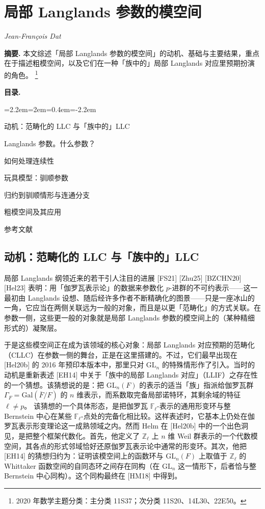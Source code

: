 \chapter{局部 Langlands 参数的模空间}
\begin{center}
{\small\itshape Jean-François Dat}
\end{center}
\medskip
\noindent\textbf{摘要.} 本文综述「局部 Langlands 参数的模空间」的动机、基础与主要结果，重点在于描述粗模空间，以及它们在一种「族中的」局部 Langlands 对应里预期扮演的角色。
\footnote{2020 年数学主题分类：主分类 11S37；次分类 11S20、14L30、22E50。}

\medskip
\noindent\textbf{目录.}
\begin{list}{}{\leftmargin=2.2em=2em=0.4em\itemindent=-2.2em}
\item 动机：范畴化的 LLC 与「族中的」LLC
\item Langlands 参数。什么参数？
\item 如何处理连续性
\item 玩具模型：驯顺参数
\item 归约到驯顺情形与连通分支
\item 粗模空间及其应用
\item 参考文献
\end{list}

\section{动机：范畴化的 LLC 与「族中的」LLC}

局部 Langlands 纲领近来的若干引人注目的进展 [FS21] [Zhu25] [BZCHN20] [Hel23] 表明：用「伽罗瓦表示论」的数据来参数化 $p$-进群的不可约表示——这一最初由 Langlands 设想、随后经许多作者不断精确化的图景——只是一座冰山的一角，它应当在两侧关联远为一般的对象，而且是以更「范畴化」的方式关联。在参数一侧，这些更一般的对象就是局部 Langlands 参数的模空间上的（某种精细形式的）凝聚层。

于是这些模空间正在成为该领域的核心对象：局部 Langlands 对应预期的范畴化（CLLC）在参数一侧的舞台，正是在这里搭建的。不过，它们最早出现在 [Hel20b] 的 2016 年预印本版本中，那里只对 $\mathrm{GL}_n$ 的特殊情形作了引入。当时的动机是重新表述 [EH14] 中关于「族中的局部 Langlands 对应」（LLIF）之存在性的一个猜想。该猜想说的是：把 $\mathrm{GL}_n(F)$ 的表示的适当「族」指派给伽罗瓦群 $\Gamma_F = \mathrm{Gal}(\overline F/F)$ 的 $n$ 维表示，而系数取完备局部诺特环，其剩余域的特征 $\ell \neq p$。
该猜想的一个具体形态，是把伽罗瓦 $\mathbb F_\ell$-表示的通用形变环与整 Bernstein 中心在某些 $\mathbb F_\ell$-点处的完备化相比较。这样表述时，它基本上仍处在伽罗瓦表示形变理论这一成熟领域之内。然而 Helm 在 [Hel20b] 中的一个出色洞见，是把整个框架代数化。首先，他定义了 $\mathbb Z_\ell$ 上 $n$ 维 Weil 群表示的一个代数模空间，其各点的形式邻域恰好还原伽罗瓦表示论中通常的形变环。其次，他把 [EH14] 的猜想归约为：证明该模空间上的函数环与 $\mathrm{GL}_n(F)$ 上取值于 $\mathbb Z_\ell$ 的 Whittaker 函数空间的自同态环之间存在同构（在 $\mathrm{GL}_n$ 这一情形下，后者恰与整 Bernstein 中心同构）。这个同构最终在 [HM18] 中得到。


